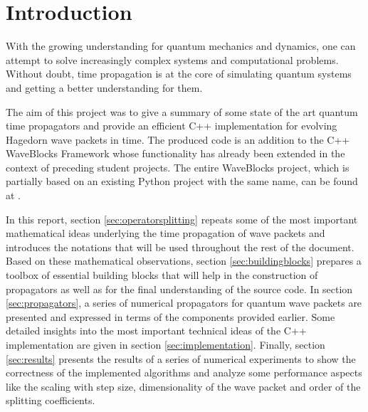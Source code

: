 \section*{Introduction}
%
With the growing understanding for quantum mechanics and dynamics, one can attempt to solve increasingly complex systems and computational problems.
Without doubt, time propagation is at the core of simulating quantum systems and getting a better understanding for them.
\par\medskip
%
The aim of this project was to give a summary of some state of the art quantum time propagators and provide an efficient C++ implementation for evolving Hagedorn wave packets in time.
The produced code is an addition to the C++ WaveBlocks Framework whose functionality has already been extended in the context of preceding student projects.
The entire WaveBlocks project, which is partially based on an existing Python project with the same name, can be found at \cite{libwaveblocks}.
\par\medskip
%
In this report, section \ref{sec:operatorsplitting} repeats some of the most important mathematical ideas underlying the time propagation of wave packets and introduces the notations that will be used throughout the rest of the document.
Based on these mathematical observations, section \ref{sec:buildingblocks} prepares a toolbox of essential building blocks that will help in the construction of propagators as well as for the final understanding of the source code.
In section \ref{sec:propagators}, a series of numerical propagators for quantum wave packets are presented and expressed in terms of the components provided earlier.
Some detailed insights into the most important technical ideas of the C++ implementation are given in section \ref{sec:implementation}.
Finally, section \ref{sec:results} presents the results of a series of numerical experiments to show the correctness of the implemented algorithms and analyze some performance aspects like the scaling with step size, dimensionality of the wave packet and order of the splitting coefficients.
